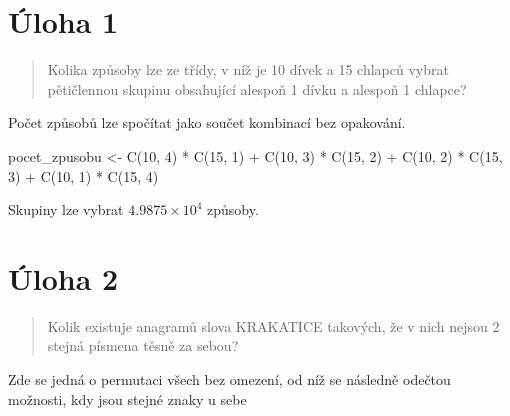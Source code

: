 \documentclass[
]{scrreprt}
\newenvironment{Shaded}{\begin{snugshade}}{\end{snugshade}}
\newcommand{\DecValTok}[1]{\textcolor[rgb]{0.00,0.00,0.81}{#1}}
\newcommand{\FunctionTok}[1]{\textcolor[rgb]{0.00,0.00,0.00}{#1}}
\newcommand{\NormalTok}[1]{#1}
\newcommand{\OtherTok}[1]{\textcolor[rgb]{0.56,0.35,0.01}{#1}}
\newcommand{\SpecialCharTok}[1]{\textcolor[rgb]{0.00,0.00,0.00}{#1}}
\begin{document}
\hypertarget{uxfaloha-1}{%
\chapter{Úloha 1}\label{uxfaloha-1}}

\begin{quote}
Kolika způsoby lze ze třídy, v níž je 10 dívek a 15 chlapců vybrat
pětičlennou skupinu obsahující alespoň 1 dívku a alespoň 1 chlapce?
\end{quote}

Počet způsobů lze spočítat jako součet kombinací bez opakování.

\begin{Shaded}
\begin{Highlighting}[]
\NormalTok{pocet\_zpusobu }\OtherTok{\textless{}{-}}
        \FunctionTok{C}\NormalTok{(}\DecValTok{10}\NormalTok{, }\DecValTok{4}\NormalTok{) }\SpecialCharTok{*} \FunctionTok{C}\NormalTok{(}\DecValTok{15}\NormalTok{, }\DecValTok{1}\NormalTok{) }\SpecialCharTok{+}
        \FunctionTok{C}\NormalTok{(}\DecValTok{10}\NormalTok{, }\DecValTok{3}\NormalTok{) }\SpecialCharTok{*} \FunctionTok{C}\NormalTok{(}\DecValTok{15}\NormalTok{, }\DecValTok{2}\NormalTok{) }\SpecialCharTok{+}
        \FunctionTok{C}\NormalTok{(}\DecValTok{10}\NormalTok{, }\DecValTok{2}\NormalTok{) }\SpecialCharTok{*} \FunctionTok{C}\NormalTok{(}\DecValTok{15}\NormalTok{, }\DecValTok{3}\NormalTok{) }\SpecialCharTok{+}
        \FunctionTok{C}\NormalTok{(}\DecValTok{10}\NormalTok{, }\DecValTok{1}\NormalTok{) }\SpecialCharTok{*} \FunctionTok{C}\NormalTok{(}\DecValTok{15}\NormalTok{, }\DecValTok{4}\NormalTok{)}
\end{Highlighting}
\end{Shaded}

Skupiny lze vybrat \ensuremath{4.9875\times 10^{4}} způsoby.

\hypertarget{uxfaloha-2}{%
\chapter{Úloha 2}\label{uxfaloha-2}}

\begin{quote}
Kolik existuje anagramů slova KRAKATICE takových, že v nich nejsou 2
stejná písmena těsně za sebou?
\end{quote}

Zde se jedná o permutaci všech bez omezení, od níž se následně odečtou
možnosti, kdy jsou stejné znaky u sebe
\end{document}
